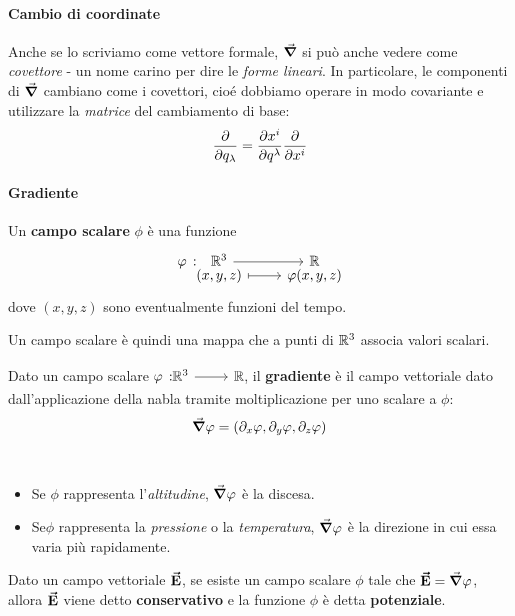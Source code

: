 \paragraph{Cambio di coordinate} %
Anche se lo scriviamo come vettore formale, $\grad$ si può anche vedere come \textit{covettore} - un nome carino per dire le \textit{forme lineari}. In particolare, le componenti di $\grad$ cambiano come i covettori, cioé dobbiamo operare in modo covariante e utilizzare la \textit{matrice} del cambiamento di base:
\begin{equation}
	\pdv{q_\lambda}=\pdv{x^i}{q^\lambda}\pdv{x^i}
\end{equation}
\paragraph{Gradiente}
\begin{define}
	Un \textbf{campo scalare} $\phi$ è una funzione
	\begin{equation}
		\funztot[\phi]{\realset^3}{\realset}{(x,y,z)}{\phi(x,y,z)}
	\end{equation}
	dove $(x,y,z)$ sono eventualmente funzioni del tempo.
\end{define}
Un campo scalare è quindi una mappa che a punti di $\mathbb{R}^3$ associa valori scalari.
\begin{define}[Gradiente]\label{gradiente}
	Dato un campo scalare $\funz[\phi]{\realset^3}{\realset}$, il \textbf{gradiente} è il campo vettoriale dato dall'applicazione della nabla tramite moltiplicazione per uno scalare a $\phi$:
	\begin{equation}
		\grad{\varphi}=\left(\partial_x\varphi,\partial_y\varphi,\partial_z\varphi\right)
	\end{equation}
\end{define}
\begin{examples}~
	\begin{itemize}
		\item Se $\phi$ rappresenta l'\textit{altitudine}, $\grad{\varphi}$ è la discesa.
		\item Se$\phi$ rappresenta la \textit{pressione} o la \textit{temperatura}, $\grad{\varphi}$ è la direzione in cui essa varia più rapidamente.
	\end{itemize}
\end{examples}
\begin{define}
	Dato un campo vettoriale $\vb*{\va{E}}$, se esiste un campo scalare $\phi$ tale che $\vb*{\va{E}}=\grad{\varphi}$, allora $\vb*{\va{E}}$ viene detto \textbf{conservativo} e la funzione $\phi$ è detta \textbf{potenziale}.
\end{define}
